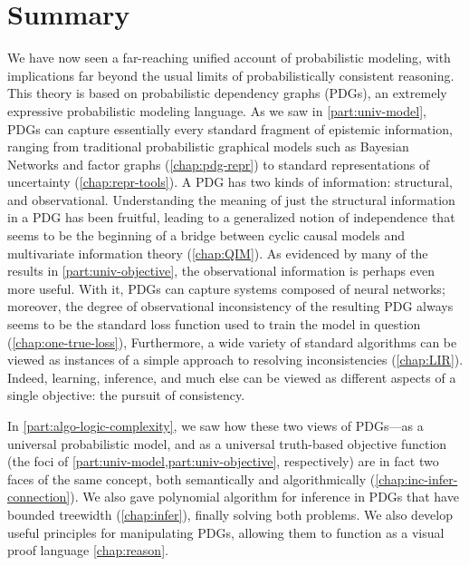 
\section{Summary}

We have now seen a far-reaching unified account of probabilistic modeling,
    with implications far beyond the usual limits of probabilistically consistent reasoning. 
%
This theory is based on probabilistic dependency graphs (PDGs), an extremely expressive probabilistic modeling language.
As we saw in \cref{part:univ-model}, PDGs can capture essentially every standard fragment of epistemic information, ranging from traditional probabilistic graphical models such as Bayesian Networks and factor graphs (\cref{chap:pdg-repr}) to standard representations of uncertainty (\cref{chap:repr-tools}).
A PDG has two kinds of information: structural, and observational.
Understanding the meaning of just the structural information in a PDG has been fruitful, leading to a generalized notion of independence that seems to be the beginning of a bridge between cyclic causal models and multivariate information theory (\cref{chap:QIM}). 
%
As evidenced by many of the results in \cref{part:univ-objective}, the observational information is perhaps even more useful. 
With it, PDGs can capture systems composed of neural networks; moreover, 
    the degree of observational inconsistency of the resulting PDG always seems to be the standard loss function used to train the model in question (\cref{chap:one-true-loss}),
Furthermore, a wide variety of standard algorithms can be viewed as instances of a simple approach to resolving inconsistencies (\cref{chap:LIR}).
Indeed, learning, inference, and 
    much else can be viewed as different aspects of a single objective: the pursuit of consistency. 

In \cref{part:algo-logic-complexity}, we saw how these two views of PDGs---as a universal probabilistic model, and as a universal truth-based objective function (the foci of \cref{part:univ-model,part:univ-objective}, respectively) are in fact two faces of the same concept, both semantically and algorithmically (\cref{chap:inc-infer-connection}). 
We also gave polynomial algorithm for inference in PDGs that have bounded treewidth (\cref{chap:infer}), finally solving both problems. 
We also develop useful principles for manipulating PDGs, 
    allowing them to function as a visual proof language \cref{chap:reason}.


